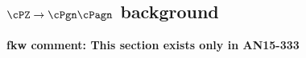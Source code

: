 \subsection{\texorpdfstring{$\cPZ\to\cPgn\cPagn$}{Znunu} background}
\label{sec:bkgZnunu}

{\bf fkw comment: This section exists only in AN15-333 }
